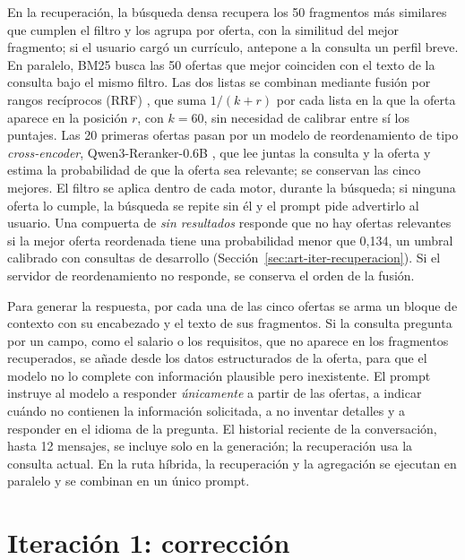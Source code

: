 \label{sec:art-recuperacion}En la recuperación, la búsqueda densa recupera los 50 fragmentos más similares que cumplen el filtro y los agrupa por oferta, con la similitud del mejor fragmento; si el usuario cargó un currículo, antepone a la consulta un perfil breve. En paralelo, BM25 \citep{Robertson2009} busca las 50 ofertas que mejor coinciden con el texto de la consulta bajo el mismo filtro. Las dos listas se combinan mediante fusión por rangos recíprocos (RRF) \citep{Cormack2009}, que suma $1/(k + r)$ por cada lista en la que la oferta aparece en la posición $r$, con $k = 60$, sin necesidad de calibrar entre sí los puntajes. Las 20 primeras ofertas pasan por un modelo de reordenamiento de tipo \textit{cross-encoder}, Qwen3-Reranker-0.6B \citep{Zhang2025Qwen3}, que lee juntas la consulta y la oferta \citep{Nogueira2019} y estima la probabilidad de que la oferta sea relevante; se conservan las cinco mejores. El filtro se aplica dentro de cada motor, durante la búsqueda; si ninguna oferta lo cumple, la búsqueda se repite sin él y el prompt pide advertirlo al usuario. Una compuerta de \emph{sin resultados} responde que no hay ofertas relevantes si la mejor oferta reordenada tiene una probabilidad menor que 0,134, un umbral calibrado con consultas de desarrollo (Sección~\ref{sec:art-iter-recuperacion}). Si el servidor de reordenamiento no responde, se conserva el orden de la fusión.

Para generar la respuesta, por cada una de las cinco ofertas se arma un bloque de contexto con su encabezado y el texto de sus fragmentos. Si la consulta pregunta por un campo, como el salario o los requisitos, que no aparece en los fragmentos recuperados, se añade desde los datos estructurados de la oferta, para que el modelo no lo complete con información plausible pero inexistente. El prompt instruye al modelo a responder \emph{únicamente} a partir de las ofertas, a indicar cuándo no contienen la información solicitada, a no inventar detalles y a responder en el idioma de la pregunta. El historial reciente de la conversación, hasta 12 mensajes, se incluye solo en la generación; la recuperación usa la consulta actual. En la ruta híbrida, la recuperación y la agregación se ejecutan en paralelo y se combinan en un único prompt.

\section{Iteración 1: corrección}
\label{sec:art-vectorial}

